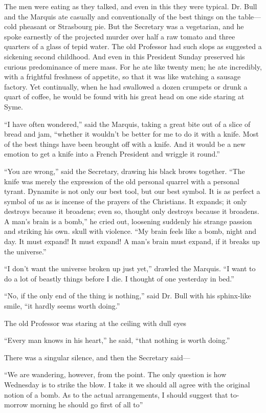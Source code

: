 \documentclass{book}
\begin{document}
The men were eating as they talked, and even in this they were typical. Dr. Bull and the Marquis ate casually and conventionally of the best things on the table—cold pheasant or Strasbourg pie. But the Secretary was a vegetarian, and he spoke earnestly of the projected murder over half a raw tomato and three quarters of a glass of tepid water. The old Professor had such slops as suggested a sickening second childhood. And even in this President Sunday preserved his curious predominance of mere mass. For he ate like twenty men; he ate incredibly, with a frightful freshness of appetite, so that it was like watching a sausage factory. Yet continually, when he had swallowed a dozen crumpets or drunk a quart of coffee, he would be found with his great head on one side staring at Syme.

“I have often wondered,” said the Marquis, taking a great bite out of a slice of bread and jam, “whether it wouldn’t be better for me to do it with a knife. Most of the best things have been brought off with a knife. And it would be a new emotion to get a knife into a French President and wriggle it round.”

“You are wrong,” said the Secretary, drawing his black brows together. “The knife was merely the expression of the old personal quarrel with a personal tyrant. Dynamite is not only our best tool, but our best symbol. It is as perfect a symbol of us as is incense of the prayers of the Christians. It expands; it only destroys because it broadens; even so, thought only destroys because it broadens. A man’s brain is a bomb,” he cried out, loosening suddenly his strange passion and striking his own. skull with violence. “My brain feels like a bomb, night and day. It must expand! It must expand! A man’s brain must expand, if it breaks up the universe.”

“I don’t want the universe broken up just yet,” drawled the Marquis. “I want to do a lot of beastly things before I die. I thought of one yesterday in bed.”

“No, if the only end of the thing is nothing,” said Dr. Bull with his sphinx-like smile, “it hardly seems worth doing.”

The old Professor was staring at the ceiling with dull eyes

“Every man knows in his heart,” he said, “that nothing is worth doing.”

There was a singular silence, and then the Secretary said—

“We are wandering, however, from the point. The only question is how Wednesday is to strike the blow. I take it we should all agree with the original notion of a bomb. As to the actual arrangements, I should suggest that to-morrow morning he should go first of all to”
\end{document}

